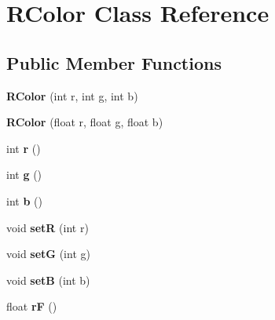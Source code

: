 \hypertarget{classRColor}{
\section{RColor Class Reference}
\label{classRColor}
}
\subsection*{Public Member Functions}
\begin{DoxyCompactItemize}
\item 
\hypertarget{classRColor_a6d57b333fe49147d4b43c50bf1b293f8}{
{\bfseries RColor} (int r, int g, int b)}
\label{classRColor_a6d57b333fe49147d4b43c50bf1b293f8}

\item 
\hypertarget{classRColor_a408c595f2c0253bd9b1de992c5465c18}{
{\bfseries RColor} (float r, float g, float b)}
\label{classRColor_a408c595f2c0253bd9b1de992c5465c18}

\item 
\hypertarget{classRColor_a5d173c9122f07fd36228fee3604f46bf}{
int {\bfseries r} ()}
\label{classRColor_a5d173c9122f07fd36228fee3604f46bf}

\item 
\hypertarget{classRColor_aff6471bd0b53bc003059c72d15c5ea43}{
int {\bfseries g} ()}
\label{classRColor_aff6471bd0b53bc003059c72d15c5ea43}

\item 
\hypertarget{classRColor_a9dc9de4130f100ebdd49ebf0e7f89cb7}{
int {\bfseries b} ()}
\label{classRColor_a9dc9de4130f100ebdd49ebf0e7f89cb7}

\item 
\hypertarget{classRColor_a4d7b5a3e3f3fce0fd37d1157caeba77a}{
void {\bfseries setR} (int r)}
\label{classRColor_a4d7b5a3e3f3fce0fd37d1157caeba77a}

\item 
\hypertarget{classRColor_a9e099175f3a28b2fd7bba213eb9156bc}{
void {\bfseries setG} (int g)}
\label{classRColor_a9e099175f3a28b2fd7bba213eb9156bc}

\item 
\hypertarget{classRColor_a3bc3ded31002c363053788592270247e}{
void {\bfseries setB} (int b)}
\label{classRColor_a3bc3ded31002c363053788592270247e}

\item 
\hypertarget{classRColor_a6707fe3c885218ee8d4f1579df405181}{
float {\bfseries rF} ()}
\label{classRColor_a6707fe3c885218ee8d4f1579df405181}


\end{DoxyCompactItemize}
